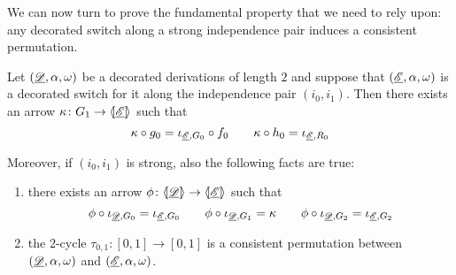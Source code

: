 We can now turn to prove the fundamental property that we need to rely upon:  any decorated switch along a strong independence pair induces a consistent permutation.

\begin{lemma}\label{lem:switchtoperm}
	Let $(\underline{\mathscr{D}}, \alpha, \omega)$ be a decorated derivations of length $2$ and suppose that $(\underline{\mathscr{E}}, \alpha, \omega)$ is a decorated switch for it along the independence pair $(i_0, i_1)$. Then there exists an arrow $\kappa\colon G_1\to \langle \hspace{-1.85pt}[ \underline{\mathscr{E}}]\hspace{-1.85pt}\rangle$ such that 
		\[\kappa \circ g_{0} = \iota_{\underline{\mathscr{E}}, G_0}\circ f_{0} \qquad \kappa\circ h_{0}= \iota_{\underline{\mathscr{E}}, R_0}\]
		
		Moreover, if $(i_0, i_1)$ is strong, also the following facts are true:
		\begin{enumerate}
		\item there exists an arrow $\phi\colon \langle \hspace{-1.85pt}[ \underline{\mathscr{D}}]\hspace{-1.85pt}\rangle\to \langle \hspace{-1.85pt}[ \underline{\mathscr{E}}]\hspace{-1.85pt}\rangle$ such that
		\[\phi \circ \iota_{\underline{\mathscr{D}}, G_0}=\iota_{\underline{\mathscr{E}}, G_0} \qquad \phi \circ \iota_{\underline{\mathscr{D}}, G_1}=\kappa \qquad \phi \circ \iota_{\underline{\mathscr{D}}, G_2}=\iota_{\underline{\mathscr{E}}, G_2}\]
		\item the $2$-cycle $\tau_{0,1}\colon [0,1]\to [0,1]$ is a consistent permutation between $(\underline{\mathscr{D}}, \alpha, \omega)$ and $(\underline{\mathscr{E}}, \alpha, \omega)$.
	\end{enumerate}
\end{lemma}
